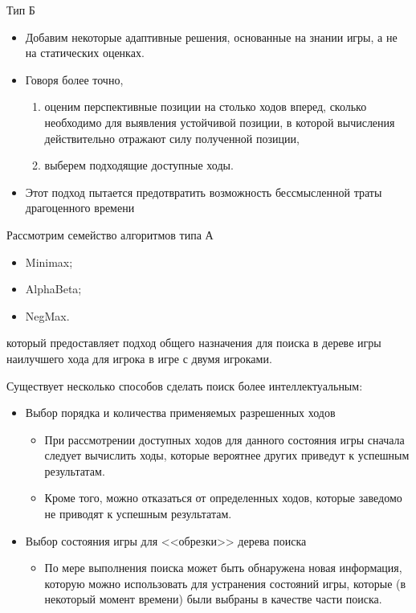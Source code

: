 \documentclass{beamer}
\begin{document}
\begin{frame}
\begin{block}{Тип Б}
\begin{itemize}
\item Добавим некоторые адаптивные решения, основанные на знании игры, а не
на статических оценках. 
\item Говоря более точно,
\begin{enumerate}
	\item оценим перспективные позиции на столько ходов вперед, сколько необходимо для выявления устойчивой позиции, в которой вычисления действительно отражают силу полученной позиции, 
	\item выберем подходящие доступные ходы. 
\end{enumerate}
\item Этот подход пытается предотвратить возможность бессмысленной траты драгоценного времени
\end{itemize}
\end{block}
Рассмотрим семейство алгоритмов типа А 
\begin{itemize}
\item Minimax;
\item AlphaBeta;
\item NegMax.
\end{itemize}
который предоставляет подход общего назначения для поиска в дереве игры наилучшего хода для игрока
в игре с двумя игроками.
\end{frame}

\begin{frame}
Существует несколько способов сделать поиск более интеллектуальным:
\begin{itemize}
\item Выбор порядка и количества применяемых разрешенных ходов
	\begin{itemize}
	\item При рассмотрении доступных ходов для данного состояния игры сначала следует вычислить ходы, которые вероятнее других приведут к успешным результатам. 
	\item Кроме того, можно отказаться от определенных ходов, которые заведомо не приводят к успешным результатам.
	\end{itemize}
\item Выбор состояния игры для <<обрезки>> дерева поиска
	\begin{itemize}
	\item По мере выполнения поиска может быть обнаружена новая информация, которую можно использовать для устранения состояний игры, которые (в некоторый момент времени) были выбраны в качестве части поиска.
	\end{itemize}
\end{itemize}
\end{frame}
\end{document}
